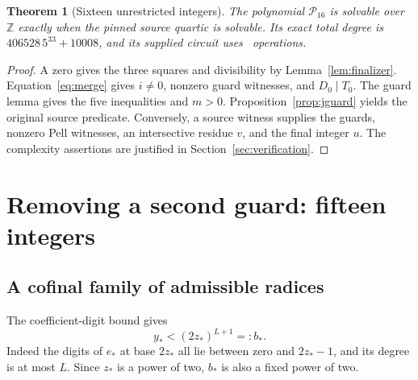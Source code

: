 \documentclass[11pt]{article}
\newtheorem{theorem}{Theorem}[section]
\theoremstyle{definition}\newtheorem{definition}[theorem]{Definition}
\newcommand{\Z}{\mathbb Z}\newcommand{\N}{\mathbb N}\newcommand{\Q}{\mathbb Q}
\begin{document}
\begin{theorem}[Sixteen unrestricted integers]\label{thm:16}
The polynomial $\mathcal P_{16}$ is solvable over $\Z$ exactly when the pinned source quartic is solvable. Its exact total degree is $406528\,5^{33}+10008$, and its supplied circuit uses \OpsSixteen\ operations.
\end{theorem}
\begin{proof}
A zero gives the three squares and divisibility by Lemma~\ref{lem:finalizer}. Equation~\eqref{eq:merge} gives $i\ne0$, nonzero guard witnesses, and $D_0\mid T_0$. The guard lemma gives the five inequalities and $m>0$. Proposition~\ref{prop:jguard} yields the original source predicate. Conversely, a source witness supplies the guards, nonzero Pell witnesses, an intersective residue $v$, and the final integer $u$. The complexity assertions are justified in Section~\ref{sec:verification}.
\end{proof}

\section{Removing a second guard: fifteen integers}\label{sec:fifteen}
\subsection{A cofinal family of admissible radices}
The coefficient-digit bound gives
\begin{equation}\label{eq:bfloor}
 y_*<(2z_*)^{L+1}=:b_*.
\end{equation}
Indeed the digits of $e_*$ at base $2z_*$ all lie between zero and $2z_*-1$, and its degree is at most $L$. Since $z_*$ is a power of two, $b_*$ is also a fixed power of two.
\end{document}
